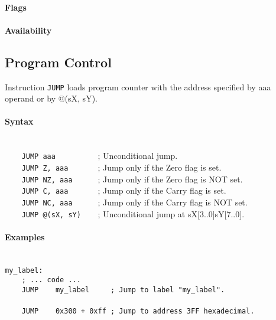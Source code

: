         \paragraph{Flags}

        \paragraph{Availability}
            \pbavailability{\yes}{\yes}{\yes}{\yes}{\yes}

\clearpage
\subsection{Program Control}
        Instruction \texttt{JUMP} loads program counter with the address specified by aaa operand or by @(sX, sY).

        \paragraph{Syntax}
            ~\\
            \verb'    JUMP aaa          '; Unconditional jump.\\
            \verb'    JUMP Z, aaa       '; Jump only if the Zero flag is set.\\
            \verb'    JUMP NZ, aaa      '; Jump only if the Zero flag is NOT set.\\
            \verb'    JUMP C, aaa       '; Jump only if the Carry flag is set.\\
            \verb'    JUMP NC, aaa      '; Jump only if the Carry flag is NOT set.\\
            \verb'    JUMP @(sX, sY)    '; Unconditional jump at sX[3..0]sY[7..0].

        \paragraph{Examples}
            ~\\
            \verb'my_label:'\\
            \verb'    ; ... code ...'\\
            \verb'    JUMP    my_label     ; Jump to label "my_label".'\\
            \verb''\\
            \verb'    JUMP    0x300 + 0xff ; Jump to address 3FF hexadecimal.'

